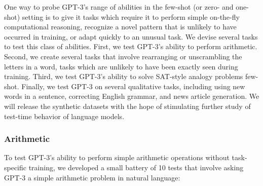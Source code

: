 \documentclass{article}
\begin{document}
One way to probe GPT-3’s range of abilities in the few-shot (or zero- and one-shot) setting is to give it tasks which require it to perform simple on-the-fly computational reasoning, recognize a novel pattern that is unlikely to have occurred in training, or adapt quickly to an unusual task.  We devise several tasks to test this class of abilities.  First, we test GPT-3’s ability to perform arithmetic.  Second, we create several tasks that involve rearranging or unscrambling the letters in a word, tasks which are unlikely to have been exactly seen during training.  Third, we test GPT-3’s ability to solve SAT-style analogy problems few-shot.  Finally, we test GPT-3 on several qualitative tasks, including using new words in a sentence, correcting English grammar, and news article generation.  We will release the synthetic datasets with the hope of stimulating further study of test-time behavior of language models.     
        \subsubsection{Arithmetic}
        \label{section:Arithmetic}
        
To test GPT-3's ability to perform simple arithmetic operations without task-specific training, we developed a small battery of 10 tests that involve asking GPT-3 a simple arithmetic problem in natural language:
\end{document}
